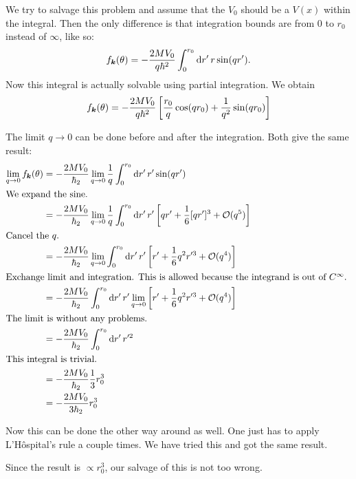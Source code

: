 \documentclass[11pt, english, fleqn, DIV=15, headinclude, BCOR=1.5cm]{scrartcl}
\begin{document}
We try to salvage this problem and assume that the $V_0$ should be a $V(x)$
within the integral. Then the only difference is that integration bounds are
from 0 to $r_0$ instead of $\infty$, like so:
\[
    f_{\boldsymbol{k}}(\theta) = - \frac{2MV_0}{q \hbar^2} \int_0^{r_0} \mathop{}\!\mathrm d r' \, r
    \sin(qr').
\]
Now this integral is actually solvable using partial integration. We obtain
\[
    f_{\boldsymbol{k}}(\theta) = - \frac{2MV_0}{q \hbar^2} \left[ 
        \frac{r_0}{q} \cos(qr_0) + \frac{1}{q^2} \sin(qr_0)
     \right]
\]

The limit $q \to 0$ can be done before and after the integration. Both give the
same result:
\begin{align*}
    \lim_{q \to 0} f_{\vec k}(\theta)
    &= - \frac{2MV_0}{\hbar_2} \lim_{q \to 0} \frac{1}{q} \int_0^{r_0} \dif r'
    \, r' \sin(q r') \\
    \intertext{%
        We expand the sine.
    }
    &= - \frac{2MV_0}{\hbar_2} \lim_{q \to 0} \frac{1}{q} \int_0^{r_0} \dif r'
    \, r' \sbr{q r' + \frac{1}{6} [qr']^3 + \mathcal O(q^5)} \\
    \intertext{%
        Cancel the $q$.
    }
    &= - \frac{2MV_0}{\hbar_2} \lim_{q \to 0} \int_0^{r_0} \dif r'
    \, r' \sbr{r' + \frac{1}{6} q^2 r'^3 + \mathcal O(q^4)} \\
    \intertext{%
        Exchange limit and integration. This is allowed because the integrand
        is out of $C^\infty$.
    }
    &= - \frac{2MV_0}{\hbar_2} \int_0^{r_0} \dif r'
    \, r' \lim_{q \to 0} \sbr{r' + \frac{1}{6} q^2 r'^3 + \mathcal O(q^4)} \\
    \intertext{%
        The limit is without any problems.
    }
    &= - \frac{2MV_0}{\hbar_2} \int_0^{r_0} \dif r' \, r'^2 \\
    \intertext{%
        This integral is trivial.
    }
    &= - \frac{2MV_0}{\hbar_2} \frac{1}{3} r_0^3 \\
    &= - \frac{2MV_0}{3\hbar_2} r_0^3
\end{align*}

Now this can be done the other way around as well. One just has to apply
L'Hôspital's rule a couple times. We have tried this and got the same result.

Since the result is $\propto r_0^3$, our salvage of this is not too wrong.
\end{document}
